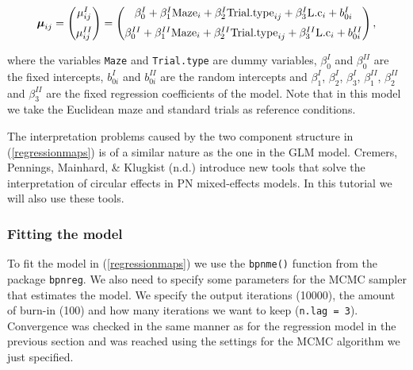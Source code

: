 \documentclass[11pt,]{article}
\begin{document}
\begin{equation}\label{regressionmaps}
\boldsymbol{\mu}_{ij} = \begin{pmatrix}
  \mu_{ij}^{I}  \vspace{0.2cm}  \\
\mu_{ij}^{II}
 \end{pmatrix}=\begin{pmatrix}
  \beta_{0}^{I} +  \beta_{1}^{I}\text{Maze}_{i}+  \beta_{2}^{I}\text{Trial.type}_{ij} + \beta_{3}^{I}\text{L.c}_{i} + b_{0i}^{I} \vspace{0.2cm}  \\
  \beta_{0}^{II} +  \beta_{1}^{II}\text{Maze}_{i}+  \beta_{2}^{II}\text{Trial.type}_{ij} + \beta_{3}^{II}\text{L.c}_{i} + b_{0i}^{II}
 \end{pmatrix},
\end{equation}

where the variables \verb|Maze| and \verb|Trial.type| are dummy
variables, \(\beta_{0}^{I}\) and \(\beta_{0}^{II}\) are the fixed
intercepts, \(b_{0i}^{I}\) and \(b_{0i}^{II}\) are the random intercepts
and \(\beta_{1}^{I}\), \(\beta_{2}^{I}\), \(\beta_{3}^{I}\),
\(\beta_{1}^{II}\), \(\beta_{2}^{II}\) and \(\beta_{3}^{II}\) are the
fixed regression coefficients of the model. Note that in this model we
take the Euclidean maze and standard trials as reference conditions.

The interpretation problems caused by the two component structure in
(\ref{regressionmaps}) is of a similar nature as the one in the GLM
model. Cremers, Pennings, Mainhard, \& Klugkist (n.d.) introduce new
tools that solve the interpretation of circular effects in PN
mixed-effects models. In this tutorial we will also use these tools.

\subsubsection{Fitting the model}\label{fitMaps}

To fit the model in (\ref{regressionmaps}) we use the \verb|bpnme()|
function from the package \verb|bpnreg|. We also need to specify some
parameters for the MCMC sampler that estimates the model. We specify the
output iterations (10000), the amount of burn-in (100) and how many
iterations we want to keep (\verb|n.lag = 3|). Convergence was checked
in the same manner as for the regression model in the previous section
and was reached using the settings for the MCMC algorithm we just
specified.
\end{document}
